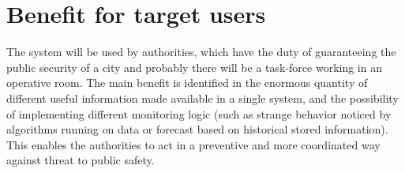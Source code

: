 \documentclass[../main.tex]{subfiles}
\begin{document}
    \section{Benefit for target users}\label{sec:benefit-for-target-users}
    The system will be used by authorities, which have the duty of guaranteeing the public security of a city and probably there will be a task-force working in an operative room.
    The main benefit is identified in the enormous quantity of different useful information made available in a single system, and the possibility of implementing different monitoring logic (such as strange behavior noticed by algorithms running on data or forecast based on historical stored information). This enables the authorities to act in a preventive and more coordinated way against threat to public safety.
\end{document}
